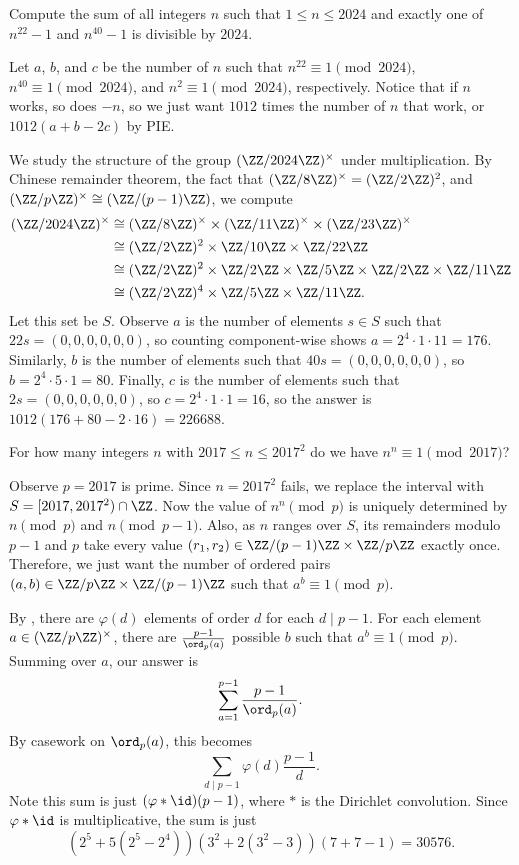 \documentclass[11pt]{scrartcl}
\begin{document}
\begin{example}
	Compute the sum of all integers $n$ such that $1 \le n \le 2024$ and exactly one of $n^{22} - 1$ and $n^{40} - 1$ is divisible by $2024$.
\end{example}

Let $a$, $b$, and $c$ be the number of $n$ such that $n^{22} \equiv 1 \pmod{2024}$, $n^{40} \equiv 1 \pmod{2024}$, and $n^2 \equiv 1 \pmod{2024}$, respectively. Notice that if $n$ works, so does $-n$, so we just want $1012$ times the number of $n$ that work, or $1012(a + b - 2c)$ by PIE.

We study the structure of the group $(\ZZ/2024\ZZ)^\times$ under multiplication. By Chinese remainder theorem, the fact that $(\ZZ/8\ZZ)^\times = (\ZZ/2\ZZ)^2$, and $(\ZZ/p\ZZ)^\times \cong (\ZZ/(p - 1)\ZZ)$, we compute
\begin{align*}
	(\ZZ/2024\ZZ)^\times &\cong (\ZZ/8\ZZ)^\times \times (\ZZ/11\ZZ)^\times \times (\ZZ/23\ZZ)^\times \\
	&\cong (\ZZ/2\ZZ)^2 \times \ZZ/10\ZZ \times \ZZ/22\ZZ \\
	&\cong (\ZZ/2\ZZ)^2 \times \ZZ/2\ZZ \times \ZZ/5\ZZ \times \ZZ/2\ZZ \times \ZZ/11\ZZ \\
	&\cong (\ZZ/2\ZZ)^4 \times \ZZ/5\ZZ \times \ZZ/11\ZZ.
\end{align*}
Let this set be $S$. Observe $a$ is the number of elements $s \in S$ such that $22s = (0,0,0,0,0,0)$, so counting component-wise shows $a = 2^4 \cdot 1 \cdot 11 = 176$. Similarly, $b$ is the number of elements such that $40s = (0,0,0,0,0,0)$, so $b = 2^4 \cdot 5 \cdot 1 = 80$. Finally, $c$ is the number of elements such that $2s = (0,0,0,0,0,0)$, so $c = 2^4 \cdot 1 \cdot 1 = 16$, so the answer is $1012(176 + 80 - 2 \cdot 16) = 226688$.

\begin{example}[PUMaC A 2016/N7]
	For how many integers $n$ with $2017 \le n \le 2017^2$ do we have $n^n \equiv 1 \pmod{2017}$?
\end{example}

Observe $p = 2017$ is prime. Since $n = 2017^2$ fails, we replace the interval with $S = [2017,2017^2) \cap \ZZ$. Now the value of $n^n \pmod{p}$ is uniquely determined by $n \pmod{p}$ and $n \pmod{p - 1}$. Also, as $n$ ranges over $S$, its remainders modulo $p - 1$ and $p$ take every value $(r_1,r_2) \in \ZZ/(p - 1)\ZZ \times \ZZ/p\ZZ$ exactly once. Therefore, we just want the number of ordered pairs $(a,b) \in \ZZ/p\ZZ \times \ZZ/(p - 1)\ZZ$ such that $a^b \equiv 1 \pmod{p}$.

By , there are $\varphi(d)$ elements of order $d$ for each $d \mid p - 1$. For each element $a \in (\ZZ/p\ZZ)^\times$, there are $\frac{p - 1}{\ord_p(a)}$ possible $b$ such that $a^b \equiv 1 \pmod{p}$. Summing over $a$, our answer is
\[\sum_{a = 1}^{p - 1}\frac{p - 1}{\ord_p(a)}.\]
By casework on $\ord_p(a)$, this becomes
\[\sum_{d \mid p - 1}\varphi(d)\frac{p - 1}{d}.\]
Note this sum is just $(\varphi \ast \id)(p - 1)$, where $\ast$ is the Dirichlet convolution. Since $\varphi \ast \id$ is multiplicative, the sum is just
\[\left(2^5 + 5(2^5 - 2^4)\right)\left(3^2 + 2(3^2 - 3)\right)\left(7 + 7 - 1\right) = 30576.\]
\end{document}
